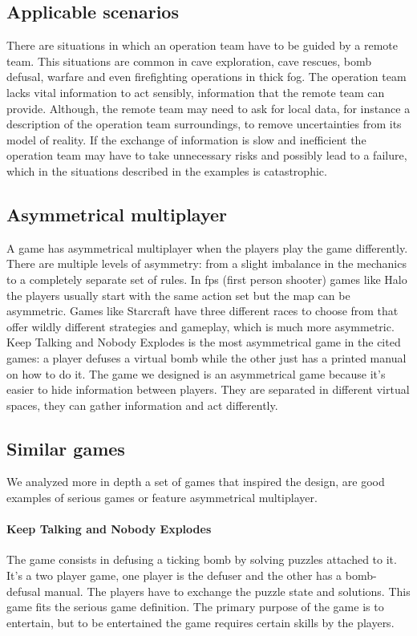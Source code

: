 \documentclass[12pt]{article}
\begin{document}
\subsection{Applicable scenarios}
There are situations in which an operation team have to be guided by a remote team. This situations are common in cave exploration, cave rescues, bomb defusal, warfare and even firefighting operations in thick fog. The operation team lacks vital information to act sensibly, information that the remote team can provide. Although, the remote team may need to ask for local data, for instance a description of the operation team surroundings, to remove uncertainties from its model of reality. If the exchange of information is slow and inefficient the operation team may have to take unnecessary risks and possibly lead to a failure, which in the situations described in the examples is catastrophic.

\subsection{Asymmetrical multiplayer}
A game has asymmetrical multiplayer when the players play the game differently. There are multiple levels of asymmetry: from a slight imbalance in the mechanics to a completely separate set of rules. In fps (first person shooter) games like Halo \cite{Halo} the players usually start with the same action set but the map can be asymmetric. Games like Starcraft \cite{starcraft} have three different races to choose from that offer wildly different strategies and gameplay, which is much more asymmetric. Keep Talking and Nobody Explodes is the most asymmetrical game in the cited games: a player defuses a virtual bomb while the other just has a printed manual on how to do it. The game we designed is an asymmetrical game because it's easier to hide information between players. They are separated in different virtual spaces, they can gather information and act differently.

\subsection{Similar games}
We analyzed more in depth a set of games that inspired the design, are good examples of serious games or feature asymmetrical multiplayer. 

\paragraph{Keep Talking and Nobody Explodes} \cite{ktne}
The game consists in defusing a ticking bomb by solving puzzles attached to it. It's a two player game, one player is the defuser and the other has a bomb-defusal manual. The players have to exchange the puzzle state and solutions. This game fits the serious game definition. The primary purpose of the game is to entertain, but to be entertained the game requires certain skills by the players. 
\end{document}

